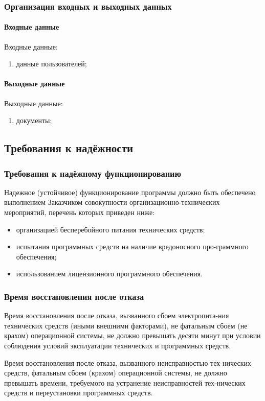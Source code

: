 \documentclass[14pt]{extarticle}        %
\begin{document}
\subsubsection{Организация входных и выходных данных}
\paragraph{Входные данные}
Входные данные:
    \begin{enumerate}
        \item данные пользователей;
    \end{enumerate}

\paragraph{Выходные данные}
Выходные данные:
    \begin{enumerate}
        \item документы;
    \end{enumerate}
    
\subsection{Требования к надёжности}  
\subsubsection{Требования к надёжному функционированию}
Надежное (устойчивое) функционирование программы должно быть обеспечено выполнением Заказчиком совокупности организационно-технических мероприятий, перечень которых приведен ниже:
\begin{itemize}
    \item организацией бесперебойного питания технических средств;
    \item испытания программных средств на наличие вредоносного про-граммного обеспечения;
    \item использованием лицензионного программного обеспечения.
\end{itemize}

\subsubsection {Время восстановления после отказа}   
Время восстановления после отказа, вызванного сбоем электропита-ния технических средств (иными внешними факторами), не фатальным сбоем (не крахом) операционной системы, не должно превышать десяти минут при условии соблюдения условий эксплуатации технических и программных средств.\par
Время восстановления после отказа, вызванного неисправностью тех-нических средств, фатальным сбоем (крахом) операционной системы, не должно превышать времени, требуемого на устранение неисправностей тех-нических средств и переустановки программных средств.
\end{document}
